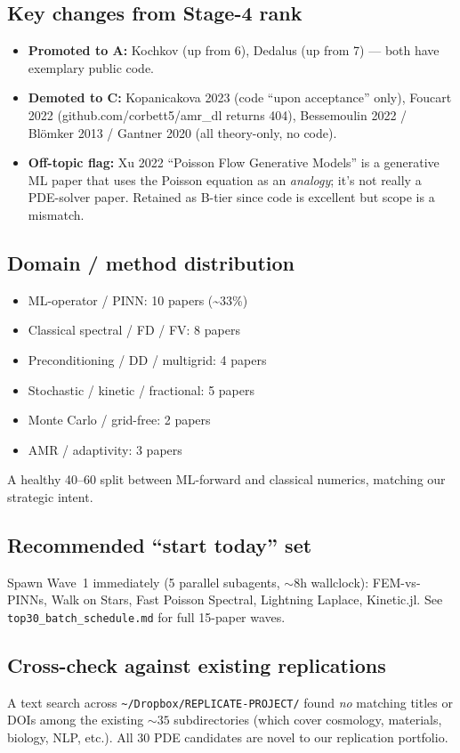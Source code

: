 \documentclass[10pt,letterpaper]{article}
\begin{document}
\subsection*{Key changes from Stage-4 rank}
\begin{itemize}
\item \textbf{Promoted to A:} Kochkov (up from 6), Dedalus (up from 7) --- both have exemplary public code.
\item \textbf{Demoted to C:} Kopanicakova 2023 (code ``upon acceptance'' only), Foucart 2022 (github.com/corbett5/amr\_dl returns 404), Bessemoulin 2022 / Blömker 2013 / Gantner 2020 (all theory-only, no code).
\item \textbf{Off-topic flag:} Xu 2022 ``Poisson Flow Generative Models'' is a generative ML paper that uses the Poisson equation as an \emph{analogy}; it's not really a PDE-solver paper. Retained as B-tier since code is excellent but scope is a mismatch.
\end{itemize}

\subsection*{Domain / method distribution}
\begin{itemize}
\item ML-operator / PINN: 10 papers (\textasciitilde 33\%)
\item Classical spectral / FD / FV: 8 papers
\item Preconditioning / DD / multigrid: 4 papers
\item Stochastic / kinetic / fractional: 5 papers
\item Monte Carlo / grid-free: 2 papers
\item AMR / adaptivity: 3 papers
\end{itemize}

A healthy 40--60 split between ML-forward and classical numerics, matching our strategic intent.

\subsection*{Recommended ``start today'' set}
Spawn Wave~1 immediately (5 parallel subagents, $\sim$8h wallclock): FEM-vs-PINNs, Walk on Stars, Fast Poisson Spectral, Lightning Laplace, Kinetic.jl. See \texttt{top30\_batch\_schedule.md} for full 15-paper waves.

\subsection*{Cross-check against existing replications}
A text search across \texttt{\textasciitilde/Dropbox/REPLICATE-PROJECT/} found \emph{no} matching titles or DOIs among the existing $\sim 35$ subdirectories (which cover cosmology, materials, biology, NLP, etc.). All 30 PDE candidates are novel to our replication portfolio.
\end{document}
